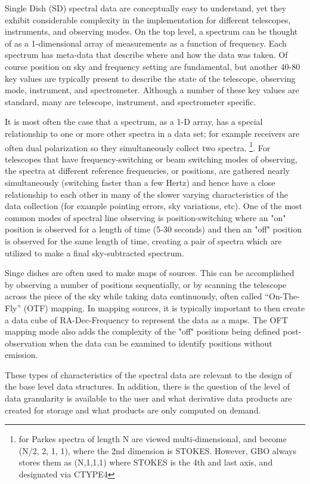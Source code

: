 \documentclass[12pt,a4paper]{article}
\begin{document}
Single Dish (SD) spectral data are conceptually easy
to understand, yet they exhibit considerable complexity in the implementation
for different telescopes, instruments, and observing modes.
On the top level, a spectrum can be thought of as a 1-dimensional array of measurements as a function of frequency.
Each spectrum has meta-data that describe
where and how the data was taken. Of course position on sky and
frequency setting are fundamental, but another 40-80 key values are typically present to describe the state of the telescope, observing mode, instrument, and spectrometer.
Although a number of these key values are standard, many are telescope, instrument, and spectrometer specific.

It is most often the case that a spectrum, as a 1-D array, has a special relationship
to one or more other spectra in a data set; for example receivers are often dual polarization so they simultaneously collect two spectra.  \footnote{for Parkes spectra
  of length N are viewed multi-dimensional, and
  become (N/2, 2, 1, 1), where the 2nd dimension is STOKES.   However, GBO
  always stores them as (N,1,1,1) where STOKES is the 4th and last axis,
  and designated via CTYPE4}.
For telescopes that have frequency-switching or beam switching modes of observing, 
the spectra at different reference frequencies, or positions, are gathered nearly simultaneously (switching faster than a few Hertz) and hence have a close relationship
to each other in many of the slower varying characteristics of the data collection
(for example pointing errors, sky variations, etc). One of the most common modes of 
spectral line observing is position-switching where an "on" position is observed for
a length of time (5-30 seconds) and then an "off" position is observed for the 
same length of time, creating a pair of spectra which are utilized to make a final sky-subtracted spectrum.

Singe dishes are often used to make maps of sources. This can be accomplished by
observing a number of positions sequentially, or by scanning the telescope
across the piece of the sky while taking data continuously, often called ``On-The-Fly'' (OTF) mapping. In mapping sources, it is typically important to then create a data cube
of RA-Dec-Frequency to represent the data as a maps. The OFT mapping mode also
adds the complexity of the "off" positions being defined post-observation when the 
data can be examined to identify positions without emission.

These types of characteristics of
the spectral data are relevant to the design of the base level data structures.
In addition, there is the question of the level of data granularity is available to the user and what derivative data products are created for storage and what products are only computed on demand.
 
\end{document}
